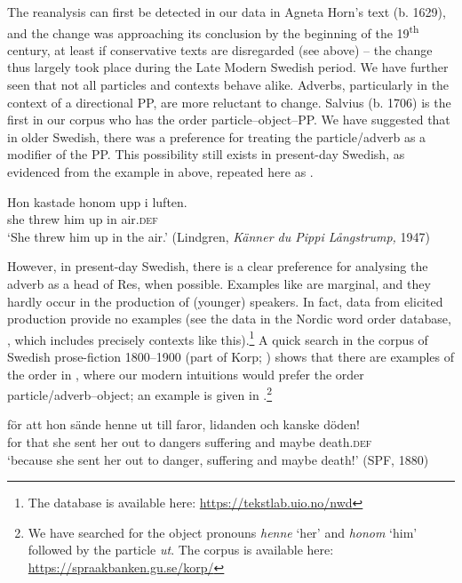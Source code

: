 \documentclass[output=paper]{langscibook}
\begin{document}
The reanalysis can first be detected in our data in Agneta Horn’s text (b. 1629), and the change was approaching its conclusion by the beginning of the 19\textsuperscript{th} century, at least if conservative texts are disregarded (see  above) – the change thus largely took place during the Late Modern Swedish period. We have further seen that not all particles and contexts behave alike. Adverbs, particularly in the context of a directional PP, are more reluctant to change. Salvius (b. 1706) is the first in our corpus who has the order particle–object–PP. We have suggested that in older Swedish, there was a preference for treating the particle/adverb as a modifier of the PP. This possibility still exists in present-day Swedish, as evidenced from the example in  above, repeated here as .


\ea\label{ex:lalu:64}
\gll  Hon    kastade   honom   upp     i   luften.\\
she       threw     him     up     in   air.\textsc{def}\\
\glt `She threw him up in the air.’ (Lindgren, \textit{Känner du Pippi Långstrump,} 1947)\\
\z


However, in present-day Swedish, there is a clear preference for analysing the adverb as a head of Res, when possible. Examples like  are marginal, and they hardly occur in the production of (younger) speakers. In fact, data from elicited production provide no examples (see the data in the Nordic word order database, \citealt{LundquistEtAl2019}, which includes precisely contexts like this).\footnote{The database is available here: \url{https://tekstlab.uio.no/nwd}}  A quick search in the corpus of Swedish prose-fiction 1800–1900 (part of Korp; \citealt{BorinEtAl2012}) shows that there are examples of the order in , where our modern intuitions would prefer the order particle/adverb–object; an example is given in .\footnote{We have searched for the object pronouns \textit{henne} ‘her’ and \textit{honom} ‘him’ followed by the particle \textit{ut}. The corpus is available here: \url{https://spraakbanken.gu.se/korp/}}


\ea\label{ex:lalu:65}
\gll  för   att   hon   sände   henne   ut     till   faror, lidanden   och  kanske   döden!\\
for   that     she   sent     her   out     to   dangers suffering   and   maybe   death.\textsc{def}\\
\glt `because she sent her out to danger, suffering and maybe death!’ (SPF, 1880)\\
\z
\end{document}
